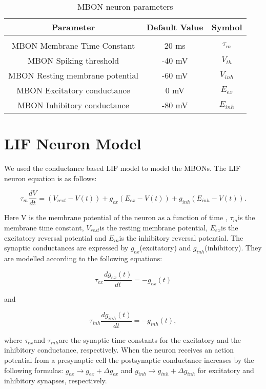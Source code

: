 \begin{table}[h]
\begin{tabular}{ccc}
\hline 
\multicolumn{1}{c}{Parameter} & \multicolumn{1}{c}{Default Value} & \multicolumn{1}{c}{Symbol }\tabularnewline
\hline 
 &  & \tabularnewline
\hline 
MBON Membrane Time Constant  & 20 ms  & $\tau_{m}$\tabularnewline
\hline 
MBON Spiking threshold  & -40 mV  & $V_{th}$\tabularnewline
\hline 
MBON Resting membrane potential  & -60 mV  & $V_{inh}$\tabularnewline
\hline 
MBON Excitatory conductance  & 0 mV  & $E_{ex}$\tabularnewline
\hline 
MBON Inhibitory conductance  & -80 mV  & $E_{inh}$\tabularnewline
\hline 
\end{tabular}

\caption{MBON neuron parameters}
\end{table}

\section{LIF Neuron Model}

We used the conductance based LIF model to model the MBONs. The LIF
neuron equation is as follows:

\begin{equation}
\tau_{m}\frac{dV}{dt}=(V_{rest}-V(t))+g_{ex}(E_{ex}-V(t))+g_{inh}(E_{inh}-V(t)).
\end{equation}
\begin{minipage}[t]{1\columnwidth}%
Here V is the membrane potential of the neuron as a function of time
, $\tau_{m}$is the membrane time constant, $V_{rest}$is the resting
membrane potential, $E_{ex}$is the excitatory reversal potential
and $E_{in}$is the inhibitory reversal potential. The synaptic conductances
are expressed by $g_{ex}$(excitatory) and $g_{inh}$(inhibitory).
They are modelled according to the following equations:%
\end{minipage}

\begin{equation}
\tau_{ex}\frac{dg_{ex}(t)}{dt}=-g_{ex}(t)
\end{equation}
\begin{minipage}[t]{1\columnwidth}%
and%
\end{minipage}

\begin{equation}
\tau_{inh}\frac{dg_{inh}(t)}{dt}=-g_{inh}(t),
\end{equation}


where $\tau_{ex}$and $\tau_{inh}$are the synaptic time constants
for the excitatory and the inhibitory conductance, respectively. When
the neuron receives an action potential from a presynaptic cell the
postsynaptic conductance increases by the following formulas: $g_{ex}\rightarrow g_{ex}+\Delta g_{ex}$
and $g_{inh}\rightarrow g_{inh}+\Delta g_{inh}$ for excitatory and
inhibitory synapses, respectively. 


